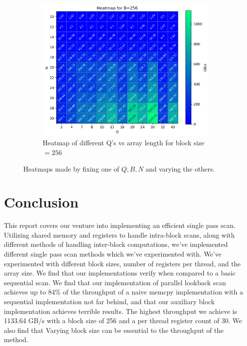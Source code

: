 \documentclass[twocolumn]{article}
\begin{document}
\begin{figure}[h]
\begin{subfigure}{0.31\linewidth}
    \end{subfigure}
    \begin{subfigure}{0.68\linewidth}
        \includegraphics[width=\linewidth]{report/plots/heatmap_QvN_B=256.png}
        \caption{Heatmap of different Q's vs array length for block size $=256$}
        \label{fig:heatmap-b}
    \end{subfigure}
    \caption{Heatmaps made by fixing one of $Q, B, N$ and varying the others.}
    \label{fig:heatmaps}
\end{figure}

\section{Conclusion}
This report covers our venture into implementing an efficient single pass scan. Utilizing shared memory and registers to handle intra-block scans, along with different methods of handling inter-block computations, we've implemented different single pass scan methods which we've experimented with. We've experimented with different block sizes, number of registers per thread, and the array size. We find that our implementations verify when compared to a basic sequential scan. We find that our implementation of parallel lookback scan achieves up to 84\% of the throughput of a naive memcpy implementation with a sequential implementation not far behind, and that our auxiliary block implementation achieves terrible results. The highest throughput we achieve is 1133.64 GB/s with a block size of 256 and a per thread register count of 30. We also find that Varying block size can be essential to the throughput of the method.
\end{document}
